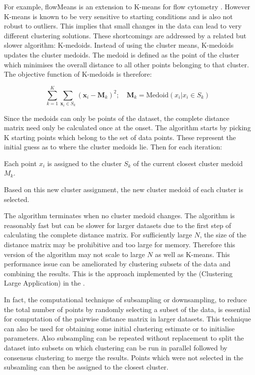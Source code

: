For example, flowMeans is an extension to K-means for flow cytometry \citep{Aghaeepour:2010fv}.
However K-means is known to be very sensitive to starting conditions and is also not robust to outliers.
This implies that small changes in the data can lead to very different clustering solutions.
These shortcomings are addressed by a related but slower algorithm: K-medoids.
Instead of using the cluster means, K-medoids updates the cluster medoids.
The medoid is defined as the point of the cluster which minimises the overall distance
to all other points belonging to that cluster.
The objective function of K-medoids is therefore:

\[
    \sum_{k=1}^{K} \sum_{\mathbf x_i \in S_k} ( \mathbf x_i - \boldsymbol M_k )^2 ; \quad \boldsymbol M_k=\text{Medoid}(x_i| x_i \in S_k)
\]

Since the medoids can only be points of the dataset, the complete distance matrix need only be calculated once at the onset.
The algorithm starts by picking K starting points which belong to the set of data points.
These represent the initial guess as to where the cluster medoids lie.
Then for each iteration:
\begin{itemise}
    \item Each point $x_i$ is assigned to the cluster $S_k$ of the current closest cluster medoid $M_k$.
    \item Based on this new cluster assignment, the new cluster medoid of each cluster is selected.
\end{itemise}
The algorithm terminates when no cluster medoid changes.
The algorithm is reasonably fast but can be slower for larger datasets due to the first step of calculating the complete distance matrix.
For sufficiently large $N$, the size of the distance matrix may be prohibitive and too large for memory.
Therefore this version of the algorithm may not scale to large $N$ as well as K-means. 
This performance issue can be ameliorated by clustering subsets of the data and combining the results.
This is the approach implemented by the  (Clustering Large Application) in the .

In fact, the computational technique of subsampling or downsampling, to reduce the total number of points by randomly selecting a subset of the data,
is essential for computation of the pairwise distance matrix in larger datasets.
This technique can also be used for obtaining some initial clustering estimate or to initialise parameters.
Also subsampling can be repeated without replacement to split the dataset into subsets on which clustering can be run in parallel
followed by consensus clustering to merge the results.
Points which were not selected in the subsamling can then be assigned to the closest cluster. 

